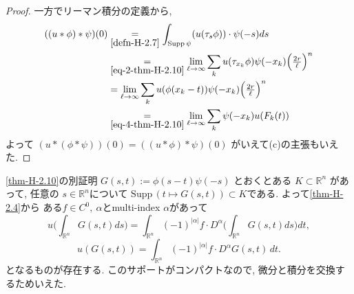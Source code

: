 \begin{proof}
一方でリーマン積分の定義から, 
\begin{align*}
((u \ast \phi) \ast \psi)(0) 
&\underset{\eqref{defn-H-2.7}}{=} \int_{\mathrm{Supp}\,\psi} (u(\tau_s \phi)) \cdot \psi(-s) ds\\
&\underset{\eqref{eq-2-thm-H-2.10}}{=}\lim_{\ell \to \infty} \sum_k u(\tau_{x_k}\phi) \psi(-x_k) \Big(\tfrac{2r}{\ell}\Big)^n\\
&= \lim_{\ell \to \infty} \sum_k u(\phi(x_k - t)) \psi(-x_k) \Big(\tfrac{2r}{\ell}\Big)^n \\
&\underset{\eqref{eq-4-thm-H-2.10}}{=} \lim_{\ell \to \infty} \sum_k \psi(-x_k) u(F_k(t))\\
\end{align*}
よって
\( (u \ast (\phi \ast \psi))(0) = ((u \ast \phi) \ast \psi)(0)\) がいえて(c)の主張もいえた. 
\end{proof}

\begin{rem}
\ref{thm-H-2.10}の別証明
\(G(s,t) := \phi(s-t)\psi(-s)\)
とおくとある
\( K \subset \mathbb{R}^n\) があって, 任意の \( s \in \mathbb{R}^n\)について
\(\mathrm{Supp}\,(t \mapsto G(s,t)) \subset K\)である. 
よって\ref{thm-H-2.4}から
ある\( f \in C^0, \ \alpha\)とmulti-index $\alpha$があって
\[
u\Big(\int_{\mathbb{R}^n} G(s,t) ds\Big)
= \int_{\mathbb{R}^n} (-1)^{|\alpha|} f \cdot D^\alpha \Big(\int_{\mathbb{R}^n} G(s,t) ds\Big) dt,
\]
\[ 
u(G(s,t)) = \int_{\mathbb{R}^n} (-1)^{|\alpha|} f \cdot D^\alpha G(s,t) \, dt.
\]
となるものが存在する. このサポートがコンパクトなので, 微分と積分を交換するためいえた.
\end{rem}

